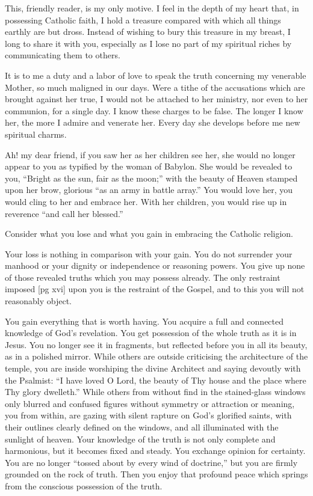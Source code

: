 This, friendly reader, is my only motive. I feel
in the depth of my heart that, in possessing Catholic
faith, I hold a treasure compared with which all
things earthly are but dross. Instead of wishing
to bury this treasure in my breast, I long to share
it with you, especially as I lose no part of my
spiritual riches by communicating them to others.

It is to me a duty and a labor of love to speak
the truth concerning my venerable Mother, so
much maligned in our days. Were a tithe of the
accusations which are brought against her true, I
would not be attached to her ministry, nor even to
her communion, for a single day. I know these
charges to be false. The longer I know her, the
more I admire and venerate her. Every day she
develops before me new spiritual charms.

Ah! my dear friend, if you saw her as her children
see her, she would no longer appear to you as
typified by the woman of Babylon. She would be
revealed to you, “Bright as the sun, fair as the
moon;” with the beauty of Heaven stamped upon
her brow, glorious “as an army in battle array.”
You would love her, you would cling to her and
embrace her. With her children, you would rise
up in reverence “and call her blessed.”

Consider what you lose and what you gain in
embracing the Catholic religion.

Your loss is nothing in comparison with your
gain. You do not surrender your manhood or
your dignity or independence or reasoning powers.
You give up none of those revealed truths which
you may possess already. The only restraint imposed
[pg xvi]
upon you is the restraint of the Gospel, and
to this you will not reasonably object.

You gain everything that is worth having. You
acquire a full and connected knowledge of God's
revelation. You get possession of the whole truth
as it is in Jesus. You no longer see it in fragments,
but reflected before you in all its beauty, as
in a polished mirror. While others are outside
criticising the architecture of the temple, you are
inside worshiping the divine Architect and saying
devoutly with the Psalmist: “I have loved O Lord,
the beauty of Thy house and the place where Thy
glory dwelleth.” While others from without find
in the stained-glass windows only blurred and confused
figures without symmetry or attraction or
meaning, you from within, are gazing with silent
rapture on God's glorified saints, with their outlines
clearly defined on the windows, and all illuminated
with the sunlight of heaven. Your knowledge
of the truth is not only complete and harmonious,
but it becomes fixed and steady. You
exchange opinion for certainty. You are no longer
“tossed about by every wind of doctrine,” but you
are firmly grounded on the rock of truth. Then
you enjoy that profound peace which springs from
the conscious possession of the truth.

